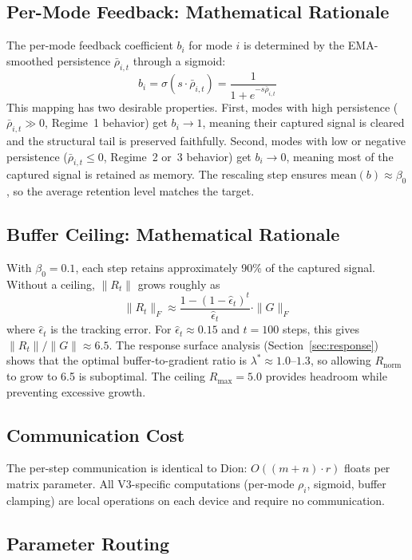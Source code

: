 \documentclass[11pt]{article}
\newcommand{\norm}[1]{\|#1\|}
\begin{document}
\subsection{Per-Mode Feedback: Mathematical Rationale}

The per-mode feedback coefficient $b_i$ for mode $i$ is determined by the EMA-smoothed persistence $\bar{\rho}_{i,t}$ through a sigmoid:
\[
b_i = \sigma(s \cdot \bar{\rho}_{i,t}) = \frac{1}{1 + e^{-s \bar{\rho}_{i,t}}}
\]
This mapping has two desirable properties. First, modes with high persistence ($\bar{\rho}_{i,t} \gg 0$, Regime~1 behavior) get $b_i \to 1$, meaning their captured signal is cleared and the structural tail is preserved faithfully. Second, modes with low or negative persistence ($\bar{\rho}_{i,t} \leq 0$, Regime~2 or~3 behavior) get $b_i \to 0$, meaning most of the captured signal is retained as memory. The rescaling step ensures $\mathrm{mean}(b) \approx \beta_0$, so the average retention level matches the target.

\subsection{Buffer Ceiling: Mathematical Rationale}

With $\beta_0 = 0.1$, each step retains approximately 90\% of the captured signal. Without a ceiling, $\norm{R_t}$ grows roughly as
\[
\norm{R_t}_F \approx \frac{1 - (1-\hat{\epsilon}_t)^t}{\hat{\epsilon}_t} \cdot \norm{G}_F
\]
where $\hat{\epsilon}_t$ is the tracking error. For $\hat{\epsilon}_t \approx 0.15$ and $t = 100$ steps, this gives $\norm{R_t} / \norm{G} \approx 6.5$. The response surface analysis (Section~\ref{sec:response}) shows that the optimal buffer-to-gradient ratio is $\lambda^* \approx 1.0$--$1.3$, so allowing $R_{\mathrm{norm}}$ to grow to 6.5 is suboptimal. The ceiling $R_{\max} = 5.0$ provides headroom while preventing excessive growth.

\subsection{Communication Cost}

The per-step communication is identical to Dion: $O((m+n) \cdot r)$ floats per matrix parameter. All V3-specific computations (per-mode $\rho_i$, sigmoid, buffer clamping) are local operations on each device and require no communication.

\subsection{Parameter Routing}
\end{document}
